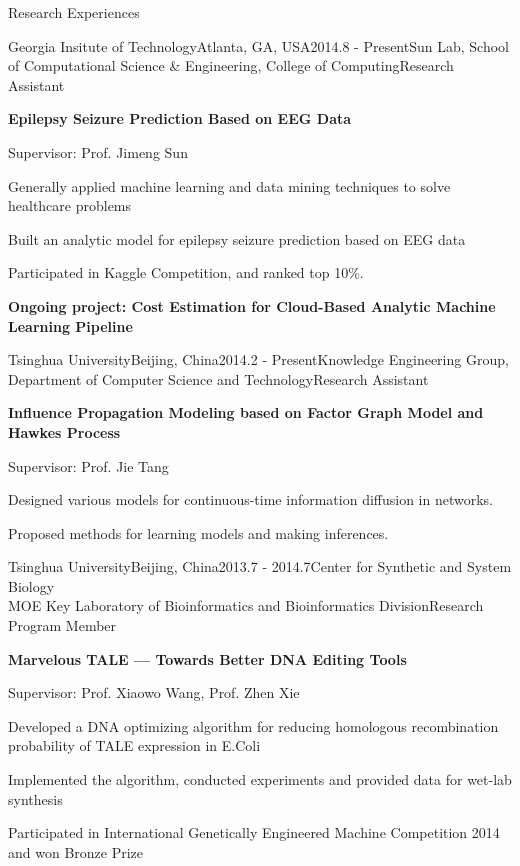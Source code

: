 \documentclass{resume} %
\begin{document}
\begin{rSection}{Research Experiences}

\begin{rSubsection}{Georgia Insitute of Technology}{Atlanta, GA, USA}{2014.8 - Present}{Sun Lab, School of Computational Science \& Engineering,  College of Computing}{Research Assistant}
\item  {\bf Epilepsy Seizure Prediction Based on EEG Data}
\item Supervisor: Prof. Jimeng Sun
\item Generally applied machine learning and data mining techniques to solve healthcare problems
\item Built an analytic model for epilepsy seizure prediction based on EEG data
\item Participated in Kaggle Competition, and ranked top 10\%.   
\item {\bf Ongoing project: Cost Estimation for Cloud-Based Analytic Machine Learning Pipeline }
\end{rSubsection}



\begin{rSubsection}{Tsinghua University}{Beijing, China}{2014.2 - Present}{Knowledge Engineering Group, Department of Computer Science and Technology}{Research Assistant}
\item {\bf Influence Propagation Modeling based on Factor Graph Model and Hawkes Process}
\item Supervisor: Prof. Jie Tang
\item Designed various models for continuous-time information diffusion in networks. 
\item Proposed methods for learning models and making inferences. 
\end{rSubsection}



\begin{rSubsection}{Tsinghua University}{Beijing, China}{2013.7 - 2014.7}{Center for Synthetic and System Biology\\ MOE Key Laboratory of Bioinformatics and Bioinformatics Division}{Research Program Member}
    \item {\bf Marvelous TALE --- Towards Better DNA Editing Tools}
	\item Supervisor: Prof. Xiaowo Wang, Prof. Zhen Xie
	\item Developed a DNA optimizing algorithm for reducing homologous recombination probability of TALE expression in E.Coli
	\item Implemented the algorithm, conducted experiments and provided data for wet-lab synthesis
	\item Participated in International Genetically Engineered Machine Competition 2014 and won Bronze Prize
\end{rSubsection}


\end{rSection}
\end{document}
